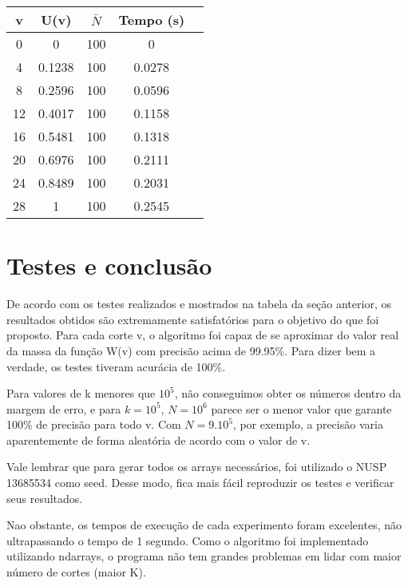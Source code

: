 \documentclass{article}
\begin{document}
	\begin{table}[htbp]
		\centering
		\begin{tabular}{|c|c|c|c|c|}
			\textbf{v} & \textbf{U(v)} & \textbf{$\bar{N}$} & \textbf{Tempo (s)}\\
			\hline
			0    & 0         & 100     & 0\\
			4    & 0.1238    & 100     & 0.0278\\
			8    & 0.2596    & 100     & 0.0596\\
			12   & 0.4017    & 100     & 0.1158\\
			16   & 0.5481    & 100     & 0.1318\\
			20   & 0.6976    & 100     & 0.2111\\
			24   & 0.8489    & 100     & 0.2031\\
			28   & 1         & 100     & 0.2545\\
		\end{tabular}
	\end{table}
	
	
	\section{Testes e conclusão}
	
	De acordo com os testes realizados e mostrados na tabela da seção anterior, os resultados obtidos são extremamente satisfatórios para o objetivo do que foi proposto. Para cada corte v, o algoritmo foi capaz de se aproximar do valor real da massa da função W(v) com precisão acima de 99.95\%. Para dizer bem a verdade, os testes tiveram acurácia de 100\%.
	
	Para valores de k menores que $10^5$, não conseguimos obter os números dentro da margem de erro, e para $k = 10^5$, $N = 10^6$ parece ser o menor valor que garante 100\% de precisão para todo v. Com $N = 9. 10^5$, por exemplo, a precisão varia aparentemente de forma aleatória de acordo com o valor de v. 
	
	Vale lembrar que para gerar todos os arrays necessários, foi utilizado o NUSP 13685534 como seed. Desse modo, fica mais fácil reproduzir os testes e verificar seus resultados.
	
	Nao obstante, os tempos de execução de cada experimento foram excelentes, não ultrapassando o tempo de 1 segundo. Como o algoritmo foi implementado utilizando ndarrays, o programa não tem grandes problemas em lidar com maior número de cortes (maior K).  
\end{document}
